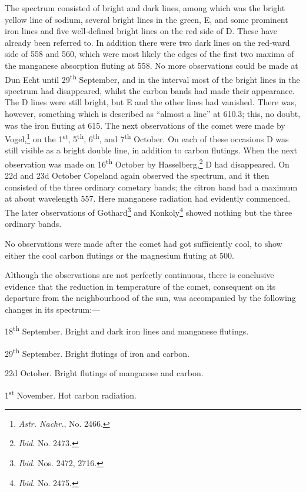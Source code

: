 \documentclass[a4paper, 12pt, oneside, polutonikogreek, english]{article}
\begin{document}
The spectrum consisted of bright and dark lines, among which was the bright yellow line of sodium, several bright lines in the green, E, and some prominent iron lines and five well-defined bright lines on the red side of D. These have already been referred to. In addition there were two dark lines on the red-ward side of 558 and 560, which were most likely the edges of the first two maxima of the manganese absorption fluting at 558. No more observations could be made at Dun Echt until 29\textsuperscript{th} September, and in the interval most of the bright lines in the spectrum had disappeared, whilst the carbon bands had made their appearance. The D lines were still bright, but E and the other lines had vanished. There was, however, something which is described as ``almost a line'' at 610.3; this, no doubt, was the iron fluting at 615. The next observations of the comet were made by Vogel,\footnote{\emph{Astr. Nachr.}, No. 2466.} on the 1\textsuperscript{st}, 5\textsuperscript{th}, 6\textsuperscript{th}, and 7\textsuperscript{th} October. On each of these occasions D was still visible as a bright double line, in addition to carbon flutings. When the next observation was made on 16\textsuperscript{th} October by Hasselberg,\footnote{\emph{Ibid.} No. 2473.} D had disappeared. On 22d and 23d October Copeland again observed the spectrum, and it then consisted of the three ordinary cometary bands; the citron band had a maximum at about wavelength 557. Here manganese radiation had evidently commenced. The later observations of Gothard\footnote{\emph{Ibid.} Nos. 2472, 2716.} and Konkoly\footnote{\emph{Ibid.} No. 2475.} showed nothing but the three ordinary bands.

No observations were made after the comet had got sufficiently cool, to show either the cool carbon flutings or the magnesium fluting at 500.

Although the observations are not perfectly continuous, there is conclusive evidence that the reduction in temperature of the comet, consequent on its departure from the neighbourhood of the sun, was accompanied by the following changes in its spectrum:---

18\textsuperscript{th} September. Bright and dark iron lines and manganese flutings.

29\textsuperscript{th} September. Bright flutings of iron and carbon.

22d October. Bright flutings of manganese and carbon.

1\textsuperscript{st} November. Hot carbon radiation.
\end{document}
